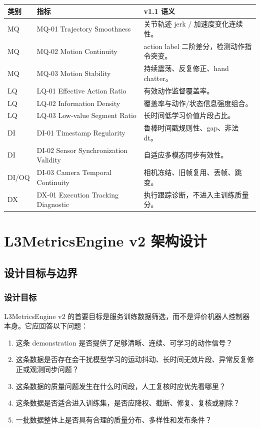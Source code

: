 \documentclass[UTF8,zihao=-4,oneside,openany]{ctexrep}
\begin{document}
\begin{center}
\small
\begin{tabularx}{\linewidth}{L{2.0cm} L{4.2cm} Y}
\toprule
类别 & 指标 & v1.1 语义 \\
\midrule
MQ & MQ-01 Trajectory Smoothness & 关节轨迹 jerk / 加速度变化连续性。 \\
MQ & MQ-02 Motion Continuity & action label 二阶差分，检测动作指令突变。 \\
MQ & MQ-03 Motion Stability & 持续震荡、反复修正、hand chatter。 \\
LQ & LQ-01 Effective Action Ratio & 有效动作监督覆盖率。 \\
LQ & LQ-02 Information Density & 覆盖率与动作/状态信息强度组合。 \\
LQ & LQ-03 Low-value Segment Ratio & 长时间低学习价值片段占比。 \\
DI & DI-01 Timestamp Regularity & 鲁棒时间戳规则性、gap、非法 dt。 \\
DI & DI-02 Sensor Synchronization Validity & 自适应多模态同步有效性。 \\
DI/OQ & DI-03 Camera Temporal Continuity & 相机冻结、旧帧复用、丢帧、跳变。 \\
DX & DX-01 Execution Tracking Diagnostic & 执行跟踪诊断，不进入主训练质量分。 \\
\bottomrule
\end{tabularx}
\end{center}

\clearpage

\chapter{L3MetricsEngine v2 架构设计}

\section{设计目标与边界}

\subsection{设计目标}

L3MetricsEngine v2 的首要目标是服务训练数据筛选，而不是评价机器人控制器本身。它应回答以下问题：

\begin{enumerate}
\item 这条 demonstration 是否提供了足够清晰、连续、可学习的动作信号？
\item 这条数据是否存在会干扰模型学习的运动抖动、长时间无效片段、异常反复修正或观测同步问题？
\item 这条数据的质量问题发生在什么时间段，人工复核时应优先看哪里？
\item 这条数据是否适合进入训练集，是否应降权、截断、修复、复核或剔除？
\item 一批数据整体上是否具有合理的质量分布、多样性和发布条件？
\end{enumerate}
\end{document}
